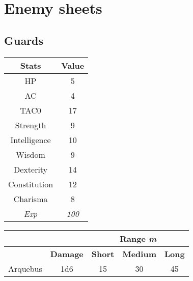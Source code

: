 \section{Enemy sheets}
\subsection{Guards}
\begin{table}[H]
  \centering
\begin{tabular}{|c|c|}
\hline
\rowcolor[HTML]{C0C0C0}
\textbf{Stats} & \textbf{Value } \\ \hline
HP & 5 \\ \hline
AC & 4 \\ \hline
TAC0 & 17 \\ \hline
Strength & 9  \\ \hline
Intelligence & 10 \\ \hline
Wisdom & 9 \\ \hline
Dexterity & 14 \\ \hline
Constitution & 12 \\ \hline
Charisma & 8 \\ \hline
\textit{Exp} & \textit{100} \\ \hline
\end{tabular}
\end{table}
\begin{table}[H]
  \centering
  \begin{tabular}{ll|c|c|c|}
    \cline{3-5}
     &  & \multicolumn{3}{c|}{\cellcolor[HTML]{C0C0C0}\textbf{Range \textit{m}}} \\ \hline
    \rowcolor[HTML]{C0C0C0}
    \multicolumn{1}{|l|}{\cellcolor[HTML]{C0C0C0}\textbf{Weapon}} & \textbf{Damage} & \multicolumn{1}{l|}{\cellcolor[HTML]{C0C0C0}\textbf{Short}} & \textbf{Medium} & \textbf{Long} \\ \hline
    \multicolumn{1}{|c|}{Arquebus} & \multicolumn{1}{c|}{1d6} & 15 & 30 & 45 \\ \hline
  \end{tabular}
\end{table}

